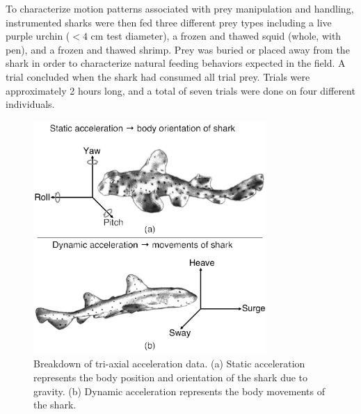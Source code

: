 \documentclass[conference]{IEEEtran}
\begin{document}
To characterize motion patterns associated with prey manipulation and handling, instrumented sharks were then fed three different prey types including a live purple urchin ($< 4$ cm test diameter), a frozen and thawed squid (whole, with pen), and a frozen and thawed shrimp. Prey was buried or placed away from the shark in order to characterize natural feeding behaviors expected in the field. A trial concluded when the shark had consumed all trial prey. Trials were approximately 2 hours long, and a total of seven trials were done on four different individuals. 

\begin{figure}[h]
	\centering
	\includegraphics[width=3.49in]{accel.pdf}
	\caption{Breakdown of tri-axial acceleration data. (a) Static acceleration represents the body position and orientation      of the shark due to gravity. (b) Dynamic acceleration represents the body movements of the shark.}
	\label{accel}
\end{figure} %
\end{document}
